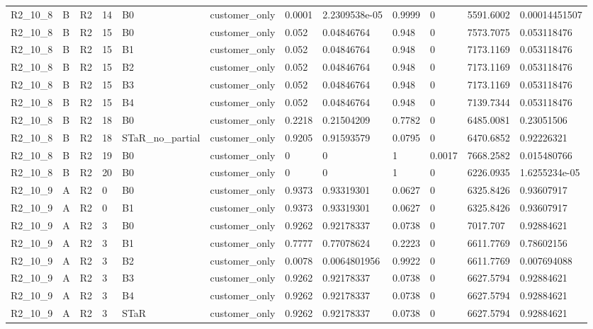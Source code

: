 \begin{longtable}{llllllllllll}
R2\_10\_8 & B & R2 & 14 & B0 & customer\_only & 0.0001 & 2.2309538e-05 & 0.9999 & 0 & 5591.6002 & 0.00014451507 \\
R2\_10\_8 & B & R2 & 15 & B0 & customer\_only & 0.052 & 0.04846764 & 0.948 & 0 & 7573.7075 & 0.053118476 \\
R2\_10\_8 & B & R2 & 15 & B1 & customer\_only & 0.052 & 0.04846764 & 0.948 & 0 & 7173.1169 & 0.053118476 \\
R2\_10\_8 & B & R2 & 15 & B2 & customer\_only & 0.052 & 0.04846764 & 0.948 & 0 & 7173.1169 & 0.053118476 \\
R2\_10\_8 & B & R2 & 15 & B3 & customer\_only & 0.052 & 0.04846764 & 0.948 & 0 & 7173.1169 & 0.053118476 \\
R2\_10\_8 & B & R2 & 15 & B4 & customer\_only & 0.052 & 0.04846764 & 0.948 & 0 & 7139.7344 & 0.053118476 \\
R2\_10\_8 & B & R2 & 18 & B0 & customer\_only & 0.2218 & 0.21504209 & 0.7782 & 0 & 6485.0081 & 0.23051506 \\
R2\_10\_8 & B & R2 & 18 & STaR\_no\_partial & customer\_only & 0.9205 & 0.91593579 & 0.0795 & 0 & 6470.6852 & 0.92226321 \\
R2\_10\_8 & B & R2 & 19 & B0 & customer\_only & 0 & 0 & 1 & 0.0017 & 7668.2582 & 0.015480766 \\
R2\_10\_8 & B & R2 & 20 & B0 & customer\_only & 0 & 0 & 1 & 0 & 6226.0935 & 1.6255234e-05 \\
R2\_10\_9 & A & R2 & 0 & B0 & customer\_only & 0.9373 & 0.93319301 & 0.0627 & 0 & 6325.8426 & 0.93607917 \\
R2\_10\_9 & A & R2 & 0 & B1 & customer\_only & 0.9373 & 0.93319301 & 0.0627 & 0 & 6325.8426 & 0.93607917 \\
R2\_10\_9 & A & R2 & 3 & B0 & customer\_only & 0.9262 & 0.92178337 & 0.0738 & 0 & 7017.707 & 0.92884621 \\
R2\_10\_9 & A & R2 & 3 & B1 & customer\_only & 0.7777 & 0.77078624 & 0.2223 & 0 & 6611.7769 & 0.78602156 \\
R2\_10\_9 & A & R2 & 3 & B2 & customer\_only & 0.0078 & 0.0064801956 & 0.9922 & 0 & 6611.7769 & 0.007694088 \\
R2\_10\_9 & A & R2 & 3 & B3 & customer\_only & 0.9262 & 0.92178337 & 0.0738 & 0 & 6627.5794 & 0.92884621 \\
R2\_10\_9 & A & R2 & 3 & B4 & customer\_only & 0.9262 & 0.92178337 & 0.0738 & 0 & 6627.5794 & 0.92884621 \\
R2\_10\_9 & A & R2 & 3 & STaR & customer\_only & 0.9262 & 0.92178337 & 0.0738 & 0 & 6627.5794 & 0.92884621 \\

\end{longtable}
